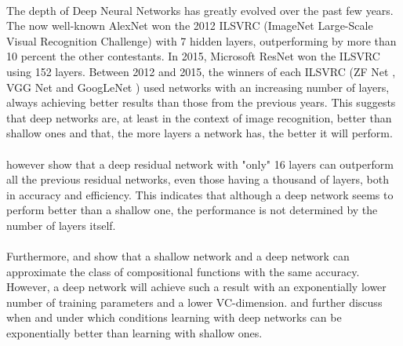 \documentclass[a4paper]{article}
\begin{document}
\paragraph{}The depth of Deep Neural Networks has greatly evolved over the past few years. The now well-known AlexNet \citep{Krizhevsky2017} won the 2012 ILSVRC (ImageNet Large-Scale Visual Recognition Challenge) with 7 hidden layers, outperforming by more than 10 percent the other contestants. In 2015, Microsoft ResNet \citep{He2016} won the ILSVRC using 152 layers. Between 2012 and 2015, the winners of each ILSVRC (ZF Net \citep{Zeiler2014}, VGG Net \citep{Simonyan2015} and GoogLeNet \citep{Szegedy2015}) used networks with an increasing number of layers, always achieving better results than those from the previous years. This suggests that deep networks are, at least in the context of image recognition, better than shallow ones and that, the more layers a network has, the better it will perform. 

\paragraph{}\citep{Zagoruyko2016} however show that a deep residual network with "only" 16 layers can outperform all the previous residual networks, even those having a thousand of layers, both in accuracy and efficiency. This indicates that although a deep network seems to perform better than a shallow one, the performance is not determined by the number of layers itself.

\paragraph{}Furthermore, \citep{Mhaskar2016} and \citep{Mhaskar2016May} show that a shallow network and a deep network can approximate the class of compositional functions with the same accuracy. However, a deep network will achieve such a result with an exponentially lower number of training parameters and a lower VC-dimension. 
\citep{Poggio2017} and \citep{Mhaskar17} further discuss when and under which conditions learning with deep networks can be exponentially better than learning with shallow ones. 
\end{document}

